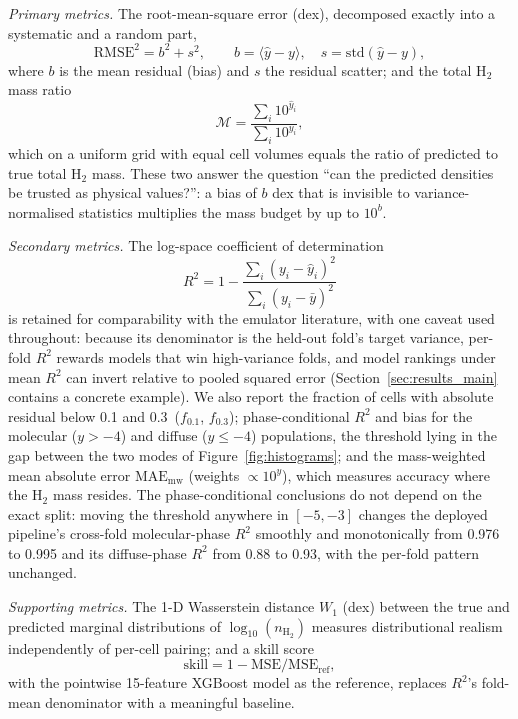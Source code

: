 \documentclass[fleqn,usenatbib]{rasti}
\newcommand{\logn}{\log_{10}(n_{\mathrm{H_2}})}
\newcommand{\dex}{\,\text{dex}}
\newcommand{\Rsq}{R^2}
\newcommand{\Mratio}{\mathcal{M}}
\begin{document}
\emph{Primary metrics.} The root-mean-square error (dex), decomposed
exactly into a systematic and a random part,
\begin{equation}
  \mathrm{RMSE}^2 = b^2 + s^2, \qquad
  b = \langle \hat{y} - y \rangle, \quad
  s = \mathrm{std}(\hat{y} - y),
  \label{eq:rmse}
\end{equation}
where \(b\) is the mean residual (bias) and \(s\) the residual scatter; and
the total H\(_2\) mass ratio
\begin{equation}
  \Mratio = \frac{\sum_i 10^{\hat{y}_i}}{\sum_i 10^{y_i}},
  \label{eq:massratio}
\end{equation}
which on a uniform grid with equal cell volumes equals the ratio of
predicted to true total H\(_2\) mass. These two answer the question
``can the predicted densities be trusted as physical values?'': a bias
of \(b\) dex that is invisible to variance-normalised statistics
multiplies the mass budget by up to \(10^{b}\).

\emph{Secondary metrics.} The log-space coefficient of determination
\begin{equation}
  \Rsq = 1 - \frac{\sum_i (y_i - \hat{y}_i)^2}{\sum_i (y_i - \bar{y})^2}
  \label{eq:r2}
\end{equation}
is retained for comparability with the emulator literature, with one
caveat used throughout: because its denominator is the held-out fold's
target variance, per-fold \(\Rsq\) rewards models that win high-variance
folds, and model rankings under mean \(\Rsq\) can invert relative to
pooled squared error (Section~\ref{sec:results_main} contains a concrete
example). We also report the fraction of cells with absolute residual
below 0.1 and 0.3\dex{} (\(f_{0.1}\), \(f_{0.3}\)); phase-conditional
\(\Rsq\) and bias for the molecular (\(y > -4\)) and diffuse (\(y \le -4\))
populations, the threshold lying in the gap between the two modes of
Figure~\ref{fig:histograms}; and the mass-weighted mean absolute error
\(\mathrm{MAE_{mw}}\) (weights \(\propto 10^{y}\)), which measures accuracy
where the H\(_2\) mass resides. The phase-conditional conclusions do not
depend on the exact split: moving the threshold anywhere in \([-5, -3]\)
changes the deployed pipeline's cross-fold molecular-phase \(\Rsq\)
smoothly and monotonically from 0.976 to 0.995 and its diffuse-phase
\(\Rsq\) from 0.88 to 0.93, with the per-fold pattern unchanged.

\emph{Supporting metrics.} The 1-D Wasserstein distance \(W_1\) (dex)
between the true and predicted marginal distributions of \(\logn\)
measures distributional realism independently of per-cell pairing; and a
skill score
\begin{equation}
  \mathrm{skill} = 1 - \mathrm{MSE}/\mathrm{MSE_{ref}},
  \label{eq:skill}
\end{equation}
with the pointwise 15-feature XGBoost model as the reference, replaces
\(\Rsq\)'s fold-mean denominator with a meaningful baseline.
\end{document}
